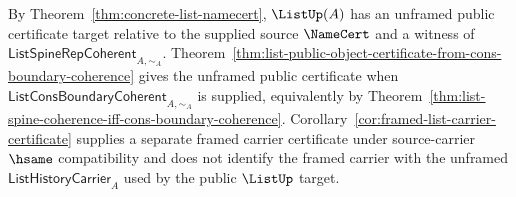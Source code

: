 \begin{corollary}
\label{cor:list-conditional-license}
By Theorem~\ref{thm:concrete-list-namecert}, $\ListUp(A)$ has an unframed public certificate target relative to the supplied source $\NameCert$ and a witness of $\mathsf{ListSpineRepCoherent}_{A,\sim_A}$. Theorem~\ref{thm:list-public-object-certificate-from-cons-boundary-coherence} gives the unframed public certificate when $\mathsf{ListConsBoundaryCoherent}_{A,\sim_A}$ is supplied, equivalently by Theorem~\ref{thm:list-spine-coherence-iff-cons-boundary-coherence}. Corollary~\ref{cor:framed-list-carrier-certificate} supplies a separate framed carrier certificate under source-carrier $\hsame$ compatibility and does not identify the framed carrier with the unframed $\mathsf{ListHistoryCarrier}_A$ used by the public $\ListUp$ target.
\end{corollary}
